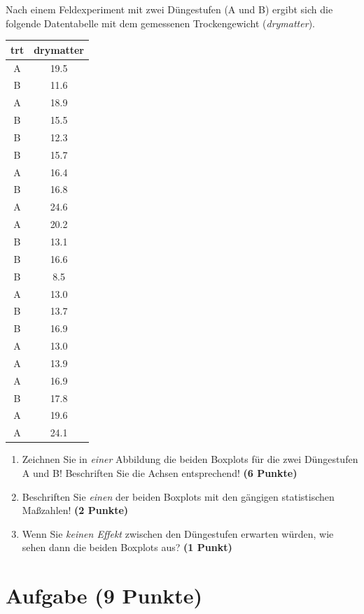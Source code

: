 \documentclass[a4paper, 10pt]{scrartcl}\usepackage[]{graphicx}\usepackage[]{xcolor}
\begin{document}
Nach einem Feldexperiment mit zwei D{\"u}ngestufen (A und B) ergibt sich die
folgende Datentabelle mit dem gemessenen Trockengewicht (\textit{drymatter}). 

\begin{table}[!h]
\centering
\begin{tabular}{cc}
\toprule
trt & drymatter\\
\midrule
A & 19.5\\
B & 11.6\\
A & 18.9\\
B & 15.5\\
B & 12.3\\
\addlinespace
B & 15.7\\
A & 16.4\\
B & 16.8\\
A & 24.6\\
A & 20.2\\
\addlinespace
B & 13.1\\
B & 16.6\\
B & 8.5\\
A & 13.0\\
B & 13.7\\
\addlinespace
B & 16.9\\
A & 13.0\\
A & 13.9\\
A & 16.9\\
B & 17.8\\
\addlinespace
A & 19.6\\
A & 24.1\\
\bottomrule
\end{tabular}
\end{table}



\begin{enumerate}
\item Zeichnen Sie in \textit{einer} Abbildung die beiden Boxplots f{\"u}r die
  zwei D{\"u}ngestufen A und B! Beschriften Sie die Achsen entsprechend!
  \textbf{(6 Punkte)}
\item Beschriften Sie \textit{einen} der beiden Boxplots mit den g{\"a}ngigen
  statistischen Ma{\ss}zahlen! \textbf{(2 Punkte)}
\item Wenn Sie \textit{keinen Effekt} zwischen den D{\"u}ngestufen erwarten
  w{\"u}rden, wie sehen dann die beiden Boxplots aus? \textbf{(1 Punkt)}
\end{enumerate} 
\clearpage

\section{Aufgabe \hfill (9 Punkte)}
\end{document}
